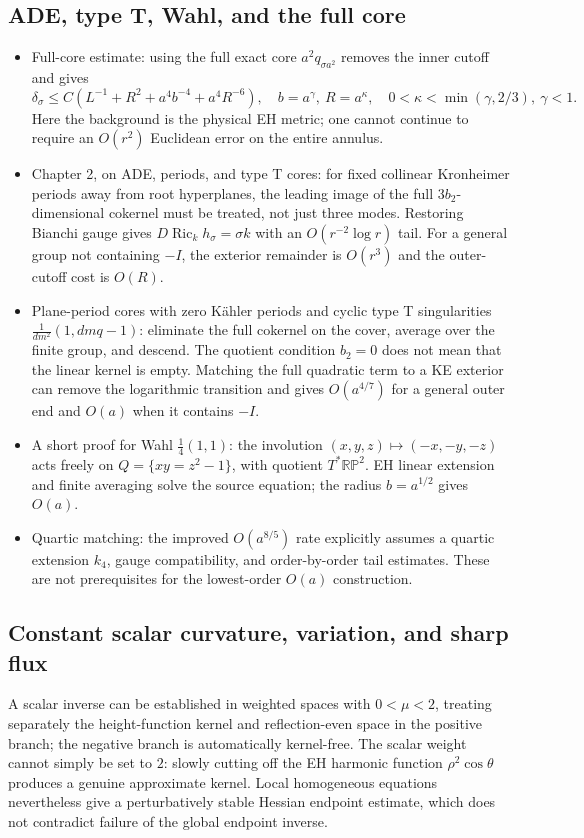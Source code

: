 \documentclass[a4paper,11pt]{article}
\numberwithin{equation}{section}
\theoremstyle{definition}
\newcommand{\Ric}{\operatorname{Ric}}
\begin{document}
\subsection{ADE, type T, Wahl, and the full core}
\begin{itemize}
\item Full-core estimate: using the full exact core $a^2q_{\sigma a^2}$ removes the inner cutoff and gives
\[
\delta_\sigma\le C(L^{-1}+R^2+a^4b^{-4}+a^4R^{-6}),
\quad b=a^\gamma,\ R=a^\kappa,
\quad0<\kappa<\min(\gamma,2/3),\ \gamma<1.
\]
Here the background is the physical EH metric; one cannot continue to require an $O(r^2)$ Euclidean error on the entire annulus.
\item Chapter 2, on ADE, periods, and type T cores: for fixed collinear Kronheimer periods away from root hyperplanes, the leading image of the full $3b_2$-dimensional cokernel must be treated, not just three modes. Restoring Bianchi gauge gives $D\Ric_kh_\sigma=\sigma k$ with an $O(r^{-2}\log r)$ tail. For a general group not containing $-I$, the exterior remainder is $O(r^3)$ and the outer-cutoff cost is $O(R)$.
\item Plane-period cores with zero K\"ahler periods and cyclic type T singularities
$\frac1{dm^2}(1,dmq-1)$: eliminate the full cokernel on the cover, average over the finite group, and descend. The quotient condition $b_2=0$ does not mean that the linear kernel is empty. Matching the full quadratic term to a KE exterior can remove the logarithmic transition and gives $O(a^{4/7})$ for a general outer end and $O(a)$ when it contains $-I$.
\item A short proof for Wahl $\frac14(1,1)$: the involution $(x,y,z)\mapsto(-x,-y,-z)$ acts freely on $Q=\{xy=z^2-1\}$, with quotient $T^*\mathbb{RP}^2$. EH linear extension and finite averaging solve the source equation; the radius $b=a^{1/2}$ gives $O(a)$.
\item Quartic matching: the improved $O(a^{8/5})$ rate explicitly assumes a quartic extension $k_4$, gauge compatibility, and order-by-order tail estimates. These are not prerequisites for the lowest-order $O(a)$ construction.
\end{itemize}

\subsection{Constant scalar curvature, variation, and sharp flux}
A scalar inverse can be established in weighted spaces with $0<\mu<2$, treating separately the height-function kernel and reflection-even space in the positive branch; the negative branch is automatically kernel-free. The scalar weight cannot simply be set to $2$: slowly cutting off the EH harmonic function $\rho^2\cos\theta$ produces a genuine approximate kernel. Local homogeneous equations nevertheless give a perturbatively stable Hessian endpoint estimate, which does not contradict failure of the global endpoint inverse.
\end{document}
